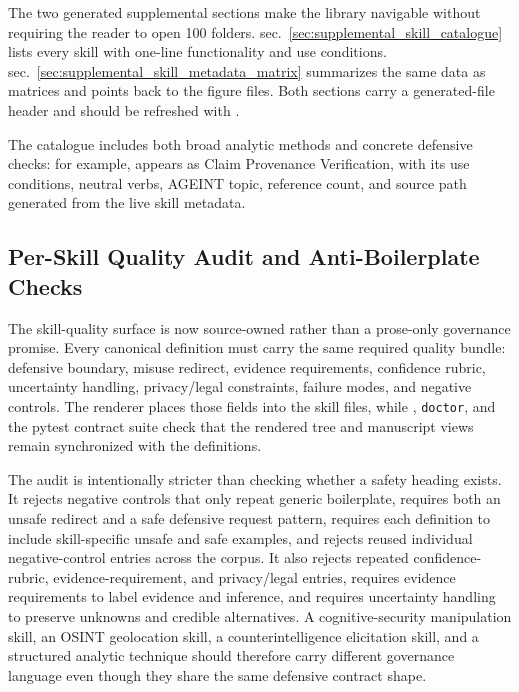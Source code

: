 \documentclass[
]{article}
\begin{document}
The two generated supplemental sections make the library navigable
without requiring the reader to open 100 folders.
sec.~\ref{sec:supplemental_skill_catalogue} lists every skill with
one-line functionality and use conditions.
sec.~\ref{sec:supplemental_skill_metadata_matrix} summarizes the same
data as matrices and points back to the figure files. Both sections
carry a generated-file header and should be refreshed with
.

The catalogue includes both broad analytic methods and concrete
defensive checks: for example,
 appears as
Claim Provenance Verification, with its use conditions, neutral verbs,
AGEINT topic, reference count, and source path generated from the live
skill metadata.

\subsection{Per-Skill Quality Audit and Anti-Boilerplate
Checks}\label{per-skill-quality-audit-and-anti-boilerplate-checks}

The skill-quality surface is now source-owned rather than a prose-only
governance promise. Every canonical definition must carry the same
required quality bundle: defensive boundary, misuse redirect, evidence
requirements, confidence rubric, uncertainty handling, privacy/legal
constraints, failure modes, and negative controls. The renderer places
those fields into the skill files, while
, \texttt{doctor}, and the pytest
contract suite check that the rendered tree and manuscript views remain
synchronized with the definitions.

The audit is intentionally stricter than checking whether a safety
heading exists. It rejects negative controls that only repeat generic
boilerplate, requires both an unsafe redirect and a safe defensive
request pattern, requires each definition to include skill-specific
unsafe and safe examples, and rejects reused individual negative-control
entries across the corpus. It also rejects repeated confidence-rubric,
evidence-requirement, and privacy/legal entries, requires evidence
requirements to label evidence and inference, and requires uncertainty
handling to preserve unknowns and credible alternatives. A
cognitive-security manipulation skill, an OSINT geolocation skill, a
counterintelligence elicitation skill, and a structured analytic
technique should therefore carry different governance language even
though they share the same defensive contract shape.
\end{document}
